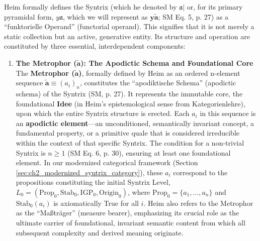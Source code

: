 \documentclass[
    12pt,              %
    a4paper,           %
    headings=normal,   %
    twoside=true,      %
    BCOR=8mm,          %
]{scrbook}
\newcommand{\q}[1]{\enquote{#1}}
\newcommand{\syntrix}{\bm{y\widetilde{a}}}
\newcommand{\metrophor}{\bm{\widetilde{a}}}
\newcommand{\Propk}[1]{\text{Prop}_{#1}}
\newcommand{\Stabk}[1]{\text{Stab}_{#1}}
\newcommand{\IGPk}[1]{\text{IGP}_{#1}}
\newcommand{\Origink}[1]{\text{Origin}_{#1}}
\begin{document}
Heim formally defines the Syntrix (which he denoted by \(\mathfrak{a}|\) or, for its primary pyramidal form, \(y\mathfrak{a}\), which we will represent as \(\syntrix\); SM Eq. 5, p. 27) as a \q{funktorielle Operand} (functorial operand). This signifies that it is not merely a static collection but an active, generative entity. Its structure and operation are constituted by three essential, interdependent components:

\begin{enumerate}[label=\arabic*.] 
    \item  \textbf{The Metrophor (\(\metrophor\)): The Apodictic Schema and Foundational Core}
        The \textbf{Metrophor (\(\metrophor\))}, formally defined by Heim as an ordered n-element sequence \(\metrophor \equiv (a_i)_n\), constitutes the \q{apodiktische Schema} (apodictic schema) of the Syntrix (SM, p. 27). It represents the immutable core, the foundational \textbf{Idee} (in Heim's epistemological sense from Kategorienlehre), upon which the entire Syntrix structure is erected. Each \(a_i\) in this sequence is an \textbf{apodictic element}—an unconditioned, semantically invariant concept, a fundamental property, or a primitive quale that is considered irreducible within the context of that specific Syntrix. The condition for a non-trivial Syntrix is \(n \ge 1\) (SM Eq. 6, p. 30), ensuring at least one foundational element. In our modernized categorical framework (Section \ref{sec:ch2_modernized_syntrix_category}), these \(a_i\) correspond to the propositions constituting the initial Syntrix Level, \(L_0 = (\Propk{0}, \Stabk{0}, \IGPk{0}, \Origink{0})\), where \(\Propk{0} = \{a_1, \ldots, a_n\}\) and \(\Stabk{0}(a_i)\) is axiomatically True for all \(i\). Heim also refers to the Metrophor as the \q{Maßträger} (measure bearer), emphasizing its crucial role as the ultimate carrier of foundational, invariant semantic content from which all subsequent complexity and derived meaning originate.


\end{enumerate}
\end{document}
